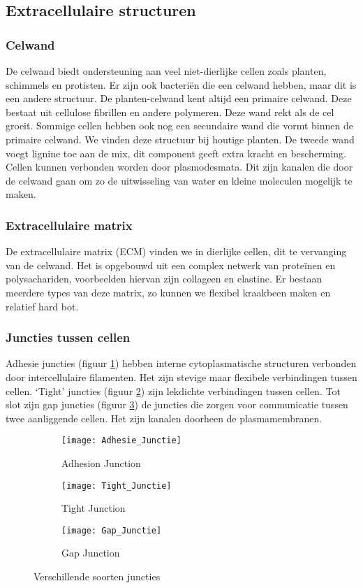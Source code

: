 \documentclass[a4paper,kul]{kulakarticle} %
\begin{document}
\subsection{Extracellulaire structuren}
\subsubsection{Celwand}
De celwand biedt ondersteuning aan veel niet-dierlijke cellen zoals planten, schimmels en protisten. Er zijn ook bacteriën die een celwand hebben, maar dit is een andere structuur. De planten-celwand kent  altijd een primaire celwand. Deze bestaat uit cellulose fibrillen en andere polymeren. Deze wand rekt als de cel groeit. Sommige cellen hebben ook nog een secundaire wand die vormt binnen de primaire celwand. We vinden deze structuur bij houtige planten. De tweede wand voegt lignine toe aan de mix, dit component geeft extra kracht en bescherming. Cellen kunnen verbonden worden door plasmodesmata. Dit zijn kanalen die door de celwand gaan om zo de uitwisseling van water en kleine moleculen mogelijk te maken.
\subsubsection{Extracellulaire matrix}
De extracellulaire matrix (ECM) vinden we in dierlijke cellen, dit te vervanging van de celwand. Het is opgebouwd uit een complex netwerk van proteïnen en polysachariden, voorbeelden hiervan zijn collageen en elastine. Er bestaan meerdere types van deze matrix, zo kunnen we flexibel kraakbeen maken en relatief hard bot. 
\subsubsection{Juncties tussen cellen}
Adhesie juncties (figuur \ref{fig:Adhesie}) hebben interne cytoplasmatische structuren verbonden door intercellulaire filamenten. Het zijn stevige maar flexibele verbindingen tussen cellen. `Tight' juncties (figuur \ref{fig:Tight}) zijn lekdichte verbindingen tussen cellen. Tot slot zijn gap juncties (figuur \ref{fig:Gap}) de juncties die zorgen voor communicatie tussen twee aanliggende cellen. Het zijn kanalen doorheen de plasmamembranen.   

\begin{figure}[h]
	\centering
	\begin{subfigure}{.33\textwidth}
		\centering
		\texttt{[image: Adhesie\_Junctie]}
		\caption{Adhesion Junction}
		\label{fig:Adhesie}
	\end{subfigure}%
	\begin{subfigure}{.33\textwidth}
		\centering
		\texttt{[image: Tight\_Junctie]}
		\caption{Tight Junction}
		\label{fig:Tight}
	\end{subfigure}%
	\begin{subfigure}{.33\textwidth}
	\centering
	\texttt{[image: Gap\_Junctie]}
	\caption{Gap Junction}
	\label{fig:Gap}
	\end{subfigure}
	\caption{Verschillende soorten juncties}
	\label{fig:Juncites}
\end{figure}
\end{document}
